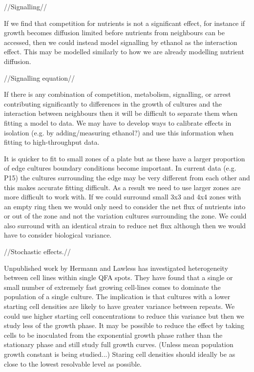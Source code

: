 //Signalling//

If we find that competition for nutrients is not a significant effect,
for instance if growth becomes diffusion limited before nutrients from
neighbours can be accessed, then we could instead model signalling by
ethanol as the interaction effect. This may be modelled similarly to
how we are already modelling nutrient diffusion.

//Signalling equation//

If there is any combination of competition, metabolism, signalling, or
arrest contributing significantly to differences in the growth of
cultures and the interaction between neighbours then it will be
difficult to separate them when fitting a model to data. We may have
to develop ways to calibrate effects in isolation (e.g. by
adding/measuring ethanol?) and use this information when fitting to
high-throughput data.

It is quicker to fit to small zones of a plate but as these have a
larger proportion of edge cultures boundary conditions become
important. In current data (e.g. P15) the cultures surrounding the
edge may be very different from each other and this makes accurate
fitting difficult. As a result we need to use larger zones are more
difficult to work with. If we could surround small 3x3 and 4x4 zones
with an empty ring then we would only need to consider the net flux of
nutrients into or out of the zone and not the variation cultures
surrounding the zone. We could also surround with an identical strain
to reduce net flux although then we would have to consider biological
variance.

//Stochastic effects.//

Unpublished work by Hermann and Lawless has
investigated heterogeneity between cell lines within single QFA
spots. They have found that a single or small number of extremely fast
growing cell-lines comes to dominate the population of a single
culture. The implication is that cultures with a lower starting cell
densities are likely to have greater variance between repeats. We
could use higher starting cell concentrations to reduce this variance
but then we study less of the growth phase. It may be possible to
reduce the effect by taking cells to be inoculated from the
exponential growth phase rather than the stationary phase and still
study full growth curves. (Unless mean population growth constant is
being studied...) Staring cell densities should ideally be as close to
the lowest resolvable level as possible.

